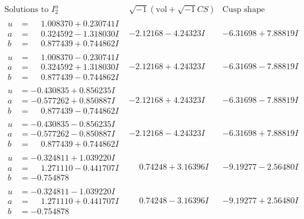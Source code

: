 \documentclass[1p]{elsarticle_modified}
\theoremstyle{definition}
\newcommand{\I}{\sqrt{-1}}
\begin{document}
$$\begin{array}{c|c|c}  
\text{Solutions to }I^u_{2}& \I (\text{vol} + \sqrt{-1}CS) & \text{Cusp shape}\\
 \hline 
\begin{aligned}
u &= \phantom{-}1.008370 + 0.230741 I \\
a &= \phantom{-}0.324592 - 1.318030 I \\
b &= \phantom{-}0.877439 + 0.744862 I\end{aligned}
 & -2.12168 - 4.24323 I & -6.31698 + 7.88819 I \\ \hline\begin{aligned}
u &= \phantom{-}1.008370 - 0.230741 I \\
a &= \phantom{-}0.324592 + 1.318030 I \\
b &= \phantom{-}0.877439 - 0.744862 I\end{aligned}
 & -2.12168 + 4.24323 I & -6.31698 - 7.88819 I \\ \hline\begin{aligned}
u &= -0.430835 + 0.856235 I \\
a &= -0.577262 + 0.850887 I \\
b &= \phantom{-}0.877439 - 0.744862 I\end{aligned}
 & -2.12168 + 4.24323 I & -6.31698 - 7.88819 I \\ \hline\begin{aligned}
u &= -0.430835 - 0.856235 I \\
a &= -0.577262 - 0.850887 I \\
b &= \phantom{-}0.877439 + 0.744862 I\end{aligned}
 & -2.12168 - 4.24323 I & -6.31698 + 7.88819 I \\ \hline\begin{aligned}
u &= -0.324811 + 1.039220 I \\
a &= \phantom{-}1.271110 - 0.441707 I \\
b &= -0.754878\phantom{ +0.000000I}\end{aligned}
 & \phantom{-}0.74248 + 3.16396 I & -9.19277 - 2.56480 I \\ \hline\begin{aligned}
u &= -0.324811 - 1.039220 I \\
a &= \phantom{-}1.271110 + 0.441707 I \\
b &= -0.754878\phantom{ +0.000000I}\end{aligned}
 & \phantom{-}0.74248 - 3.16396 I & -9.19277 + 2.56480 I \\ \hline\begin{aligned}

\end{aligned}
\end{array}$$
\end{document}
